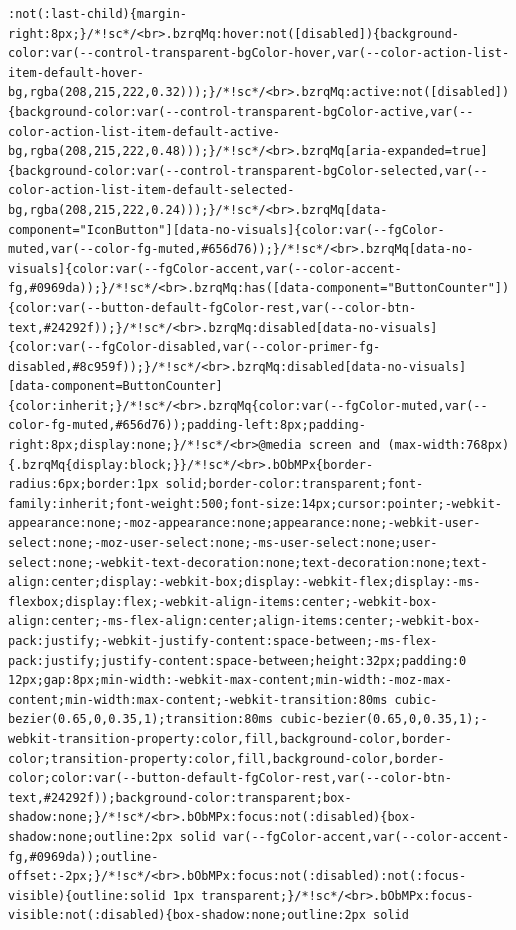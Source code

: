 \documentclass[
  letterpaper,
]{book}
\begin{document}
\begin{verbatim}
:not(:last-child){margin-right:8px;}/*!sc*/<br>.bzrqMq:hover:not([disabled]){background-color:var(--control-transparent-bgColor-hover,var(--color-action-list-item-default-hover-bg,rgba(208,215,222,0.32)));}/*!sc*/<br>.bzrqMq:active:not([disabled]){background-color:var(--control-transparent-bgColor-active,var(--color-action-list-item-default-active-bg,rgba(208,215,222,0.48)));}/*!sc*/<br>.bzrqMq[aria-expanded=true]{background-color:var(--control-transparent-bgColor-selected,var(--color-action-list-item-default-selected-bg,rgba(208,215,222,0.24)));}/*!sc*/<br>.bzrqMq[data-component="IconButton"][data-no-visuals]{color:var(--fgColor-muted,var(--color-fg-muted,#656d76));}/*!sc*/<br>.bzrqMq[data-no-visuals]{color:var(--fgColor-accent,var(--color-accent-fg,#0969da));}/*!sc*/<br>.bzrqMq:has([data-component="ButtonCounter"]){color:var(--button-default-fgColor-rest,var(--color-btn-text,#24292f));}/*!sc*/<br>.bzrqMq:disabled[data-no-visuals]{color:var(--fgColor-disabled,var(--color-primer-fg-disabled,#8c959f));}/*!sc*/<br>.bzrqMq:disabled[data-no-visuals] [data-component=ButtonCounter]{color:inherit;}/*!sc*/<br>.bzrqMq{color:var(--fgColor-muted,var(--color-fg-muted,#656d76));padding-left:8px;padding-right:8px;display:none;}/*!sc*/<br>@media screen and (max-width:768px){.bzrqMq{display:block;}}/*!sc*/<br>.bObMPx{border-radius:6px;border:1px solid;border-color:transparent;font-family:inherit;font-weight:500;font-size:14px;cursor:pointer;-webkit-appearance:none;-moz-appearance:none;appearance:none;-webkit-user-select:none;-moz-user-select:none;-ms-user-select:none;user-select:none;-webkit-text-decoration:none;text-decoration:none;text-align:center;display:-webkit-box;display:-webkit-flex;display:-ms-flexbox;display:flex;-webkit-align-items:center;-webkit-box-align:center;-ms-flex-align:center;align-items:center;-webkit-box-pack:justify;-webkit-justify-content:space-between;-ms-flex-pack:justify;justify-content:space-between;height:32px;padding:0 12px;gap:8px;min-width:-webkit-max-content;min-width:-moz-max-content;min-width:max-content;-webkit-transition:80ms cubic-bezier(0.65,0,0.35,1);transition:80ms cubic-bezier(0.65,0,0.35,1);-webkit-transition-property:color,fill,background-color,border-color;transition-property:color,fill,background-color,border-color;color:var(--button-default-fgColor-rest,var(--color-btn-text,#24292f));background-color:transparent;box-shadow:none;}/*!sc*/<br>.bObMPx:focus:not(:disabled){box-shadow:none;outline:2px solid var(--fgColor-accent,var(--color-accent-fg,#0969da));outline-offset:-2px;}/*!sc*/<br>.bObMPx:focus:not(:disabled):not(:focus-visible){outline:solid 1px transparent;}/*!sc*/<br>.bObMPx:focus-visible:not(:disabled){box-shadow:none;outline:2px solid 
\end{verbatim}
\end{document}
